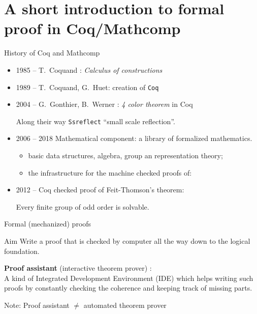 \documentclass[compress,11pt]{beamer}
\begin{document}
\section{A short introduction to formal proof in Coq/Mathcomp}
\begin{frame}{History of Coq and Mathcomp}

  \begin{itemize}
  \item 1985 -- T.~Coquand :  \emph{Calculus of constructions}
  \item 1989 -- T.~Coquand, G.~Huet: creation of \texttt{Coq}
  \item 2004 -- G.~Gonthier, B.~Werner : \emph{4 color theorem} in Coq

    Along their way \texttt{Ssreflect} ``small scale reflection''.

  \item 2006 -- 2018 Mathematical component: a library of formalized mathematics.
    \begin{itemize}
    \item basic data structures, algebra, group an representation theory;
    \item the infrastructure for the machine checked proofs of:
    \end{itemize}
  \item 2012 -- Coq checked proof of Feit-Thomson's theorem:

    Every finite group of odd order is solvable.
  \end{itemize}
\end{frame}

\begin{frame}{Formal (mechanized) proofs}

  \begin{block}{Aim}
    Write a proof that is checked by computer all the way down to the
    logical foundation.
  \end{block}
  \bigskip\pause

  \textbf{Proof assistant} (interactive theorem prover) : \\ A kind of Integrated
  Development Environment (IDE) which helps writing such proofs by constantly
  checking the coherence and keeping track of missing parts.  \bigskip

  Note: Proof assistant $\neq$ automated theorem prover
\end{frame}
\end{document}
